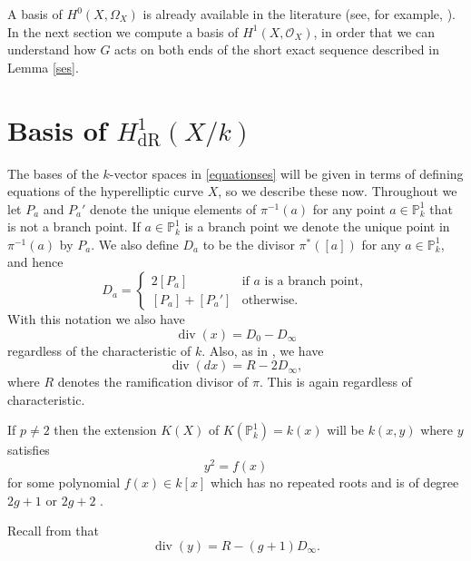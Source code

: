 \documentclass[draft, 11pt]{article} %
\theoremstyle{plain}
\theoremstyle{remark}
\newcommand{\hone}{H^1(X,\mathcal{O}_X)}
\newcommand{\derhamhone}{H_{\text {dR}}^1(X/k)}
\DeclareMathOperator{\di}{div}
\begin{document}
A basis of $H^0(X,\Omega_X)$ is already available in the literature (see, for example, \cite[Prop. 7.4.26]{liu}).
In the next section we compute a basis of $\hone$, in order that we can understand how $G$ acts on both ends of the short exact sequence described in Lemma \ref{ses}.

\section{Basis of $\derhamhone$}

The bases of the $k$-vector spaces in \eqref{equationses} will be given in terms of defining equations of the hyperelliptic curve $X$, so we describe these now.
Throughout we let $P_a$ and $P_a'$ denote the unique elements of $\pi^{-1}(a)$ for any point $a \in \mathbb P_k^1$ that is not a branch point.
If $a \in \mathbb P_k^1$ is a branch point we denote the unique point in $\pi^{-1}(a)$ by $P_a$.
We also define $D_a$ to be the divisor $\pi^*\left([a]\right)$ for any $a \in \mathbb P_k^1$, and hence
\begin{equation*}
D_a= 
\begin{cases}
 2[P_a] & \text{if $a$ is a branch point}, \\
 [P_a] + [P_a'] & \text{otherwise.}
\end{cases}
\end{equation*}
With this notation we also have
\begin{equation}\label{divxp=2}
\di (x)  = D_0 - D_\infty
\end{equation}
regardless of the characteristic of $k$.
Also, as in \cite[\S 6]{faithfulaction}, we have
\begin{equation}\label{differentialdivisor}
\di(dx) = R - 2D_\infty,
\end{equation}
where $R$ denotes the ramification divisor of $\pi$.
This is again regardless of characteristic.

If $p \neq 2$ then the extension $K(X)$ of $K(\mathbb P_k^1) = k(x)$ will be $k(x,y)$ where $y$ satisfies
\begin{equation}\label{definingequationpnot2}
y^2 = f(x)
\end{equation}
for some polynomial $f(x) \in k[x]$ which has no repeated roots and is of degree $2g+1$ or $2g+2$ \cite[Prop 7.4.24]{liu}.

Recall from \cite[\S 6]{faithfulaction} that
\begin{equation}\label{pnot2divisors}
\di(y)  = R - (g+1)D_\infty.
\end{equation}
\end{document}
